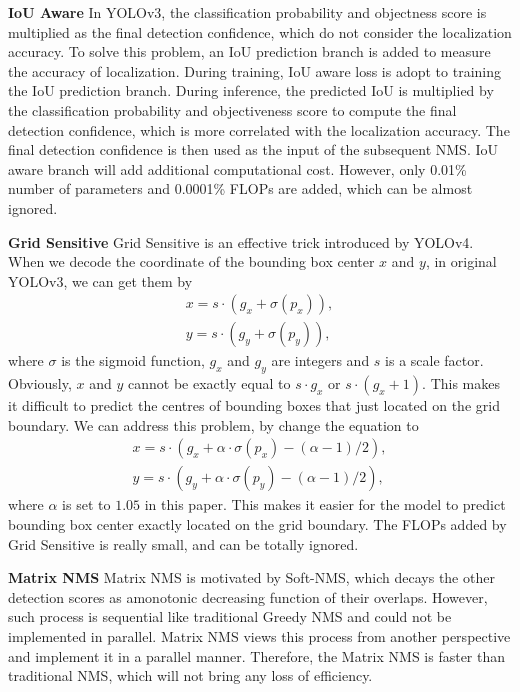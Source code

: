 \documentclass[10pt,twocolumn,letterpaper]{article}
\newcommand{\pheadB}[1] {\vspace{1mm}\noindent\textbf{#1}}
\begin{document}
	\pheadB{IoU Aware} \cite{iouaware}
	In YOLOv3, the classification probability and objectness score is multiplied as the final detection confidence, which do not consider the localization accuracy. 
	To solve this problem, an IoU prediction branch is added to measure the accuracy of localization. During training, IoU aware loss is adopt to training the IoU prediction branch.
	During inference, the predicted IoU is multiplied by the classification probability and objectiveness score to compute the final detection confidence, which is more correlated with the localization accuracy. The final detection confidence is then used as the input of the subsequent NMS. IoU aware branch will add additional computational cost. However, only 0.01\% number of parameters and 0.0001\% FLOPs are added, which can be almost ignored.
	
	\pheadB{Grid Sensitive}\cite{yolov4}
	Grid Sensitive is an effective trick introduced by YOLOv4. 
	When we decode the coordinate of the bounding box center $x$ and $y$, in original YOLOv3, we can get them by
	\begin{align}
	x = s \cdot ( g_x + \sigma(p_x) ),\\
	y = s \cdot ( g_y + \sigma(p_y) ),
	\end{align}
	where $\sigma$ is the sigmoid function, $g_x$ and $g_y$ are integers and $s$ is a scale factor. Obviously, $x$ and $y$ cannot be exactly equal to $s \cdot g_x$ or $s \cdot (g_x+1)$.
	This makes it difficult to predict the centres of bounding boxes that just located on the grid boundary. We can address this problem, by change the equation to 
	\begin{align}
	x = s \cdot ( g_x + \alpha \cdot  \sigma(p_x) - (\alpha-1)/2 ),\\
	y = s \cdot ( g_y + \alpha \cdot  \sigma(p_y) - (\alpha-1)/2 ),
	\end{align}
	where $\alpha$ is set to $1.05$ in this paper. This makes it easier for the model to predict bounding box center exactly located on the grid boundary. The FLOPs added by Grid Sensitive is really small, and can be totally ignored.
	
	\pheadB{Matrix NMS} \cite{solov2}
	Matrix NMS is motivated by Soft-NMS, which decays the other detection scores as amonotonic decreasing function of their overlaps. However, such process is sequential like traditional Greedy NMS and could not be implemented in parallel. Matrix NMS views this process from another perspective and implement it in a parallel manner.
	Therefore, the Matrix NMS is faster than traditional NMS, which will not bring any loss of efficiency.
	
\end{document}
